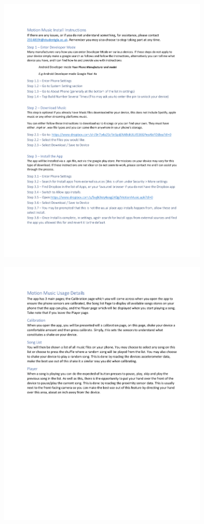 \documentclass{l4proj}
\begin{document}
\begin{appendices}
\begin{figure}[h!]
    \includegraphics[width=0.9\textwidth]{images/2Info.pdf}
\end{figure}
\begin{figure}[h!]
    \centering
    \includegraphics[width=0.9\textwidth]{images/3Info.pdf}
\end{figure}


\end{appendices}
\end{document}
